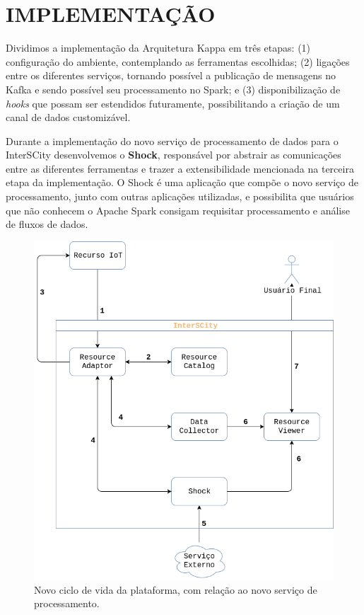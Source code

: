 \section{IMPLEMENTAÇÃO}

Dividimos a implementação da Arquitetura Kappa em três etapas:
(1) configuração do ambiente, contemplando as ferramentas escolhidas;
(2) ligações entre os diferentes serviços, tornando possível a publicação de
    mensagens no Kafka e sendo possível seu processamento no Spark; e
(3) disponibilização de \textit{hooks} que possam ser estendidos futuramente,
    possibilitando a criação de um canal de dados customizável.

Durante a implementação do novo serviço de processamento de dados para o
InterSCity desenvolvemos o \textbf{Shock}, responsável por abstrair as
comunicações entre as diferentes ferramentas e trazer a extensibilidade mencionada
na terceira etapa da implementação. O Shock é uma aplicação que compõe o
novo serviço de processamento, junto com outras aplicações utilizadas, e
possibilita que usuários que não conhecem o Apache Spark consigam requisitar
processamento e análise de fluxos de dados.

\begin{figure}[hbt]
  \centering
    \includegraphics[scale=0.45]{figuras/shock_usage.png}
    \caption{Novo ciclo de vida da plataforma, com relação ao novo serviço de processamento.}
  \label{fig:shock_usage}
\end{figure}

